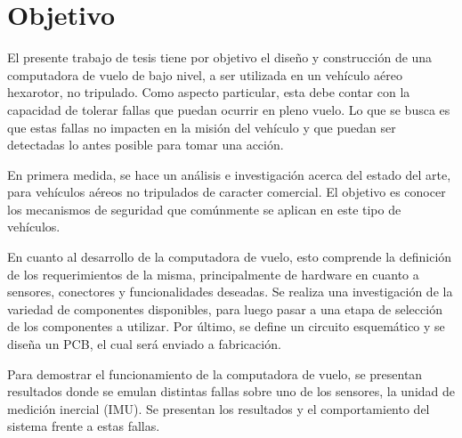 \section{Objetivo}


El presente trabajo de tesis tiene por objetivo el diseño y construcción de una computadora de vuelo de bajo nivel, a ser utilizada en un vehículo aéreo hexarotor, no tripulado. Como aspecto particular, esta debe contar con la capacidad de tolerar fallas %
que puedan ocurrir en pleno vuelo. Lo que se busca es que estas fallas no impacten en la misión del vehículo y que puedan ser detectadas lo antes posible para tomar una acción.

En primera medida, se hace un análisis e investigación acerca del estado del arte, para vehículos aéreos no tripulados de caracter comercial. El objetivo es conocer los mecanismos de seguridad que comúnmente se aplican en este tipo de vehículos.%

En cuanto al desarrollo de la computadora de vuelo, esto comprende la definición de los requerimientos de la misma, principalmente de hardware en cuanto a sensores, conectores y funcionalidades deseadas. Se realiza una investigación de la variedad de componentes disponibles, para luego pasar a una etapa de selección de los componentes a utilizar. Por último, se define un circuito esquemático y se diseña un PCB, el cual será enviado a fabricación.



Para demostrar el funcionamiento de la computadora de vuelo, se presentan resultados donde se emulan distintas fallas sobre uno de los sensores, la unidad de medición inercial (IMU). Se presentan los resultados y el comportamiento del sistema frente a estas fallas.